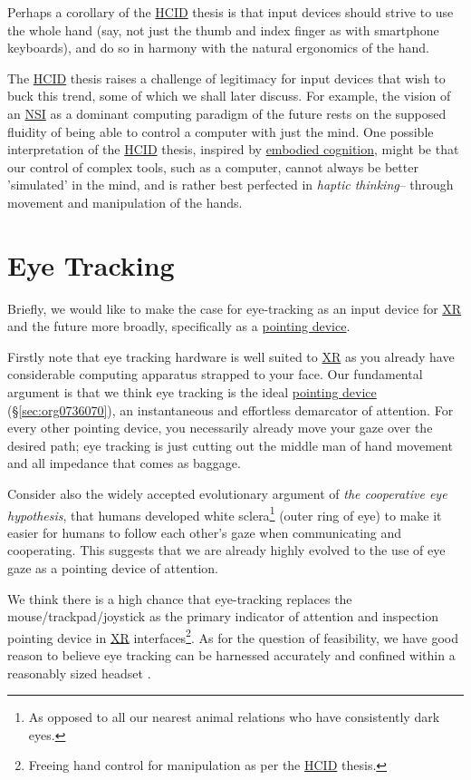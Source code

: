 \documentclass[logo,bsc,singlespacing,parskip]{infthesis}
\begin{document}
Perhaps a corollary of the \hyperref[org0c83164]{HCID} thesis is that input devices should strive to use the whole hand (say, not just the thumb and index finger as with smartphone keyboards), and do so in harmony with the natural ergonomics of the hand.

The \hyperref[org0c83164]{HCID} thesis raises a challenge of legitimacy for input devices that wish to buck this trend, some of which we shall later discuss.
For example, the vision of an \hyperref[orgf403bf3]{NSI} as a dominant computing paradigm of the future rests on the supposed fluidity of being able to control a computer with just the mind.
One possible interpretation of the \hyperref[org0c83164]{HCID} thesis, inspired by \hyperref[orgef09c3f]{embodied cognition}, might be that our control of complex tools, such as a computer, cannot always be better 'simulated' in the mind, and is rather best perfected in \emph{haptic thinking}-- through movement and manipulation of the hands.

\section{Eye Tracking}
\label{sec:orged432e5}
Briefly, we would like to make the case for eye-tracking as an input device for \hyperref[org39cbd51]{XR} and the future more broadly, specifically as a \hyperref[pointing device]{pointing device}.

Firstly note that eye tracking hardware is well suited to \hyperref[org39cbd51]{XR} as you already have considerable computing apparatus strapped to your face.
Our fundamental argument is that we think eye tracking is the ideal \hyperref[sec:org0736070]{pointing device} (\S \ref{sec:org0736070}), an instantaneous and effortless demarcator of attention.
For every other pointing device, you necessarily already move your gaze over the desired path; eye tracking is just cutting out the middle man of hand movement and all impedance that comes as baggage.

Consider also the widely accepted evolutionary argument of \emph{the cooperative eye hypothesis}, that humans developed white sclera\footnote{As opposed to all our nearest animal relations who have consistently dark eyes.} (outer ring of eye) to make it easier for humans to follow each other's gaze when communicating and cooperating.
This suggests that we are already highly evolved to the use of eye gaze as a pointing device of attention.

We think there is a high chance that eye-tracking replaces the mouse/trackpad/joystick as the primary indicator of attention and inspection pointing device in \hyperref[org39cbd51]{XR} interfaces\footnote{Freeing hand control for manipulation as per the \hyperref[org0c83164]{HCID} thesis.}.
As for the question of feasibility, we have good reason to believe eye tracking can be harnessed accurately \autocites{PrecisionGazeMouse}[][]{TobiiGamingNext} and confined within a reasonably sized headset \autocite{VIVEProEye}.
\end{document}
